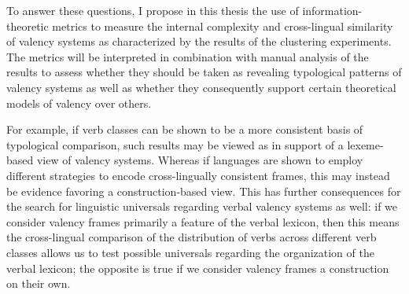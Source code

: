 To answer these questions, I propose in this thesis the use of information-theoretic metrics to measure the internal complexity and cross-lingual similarity of valency systems as characterized by the results of the clustering experiments. The metrics will be interpreted in combination with manual analysis of the results to assess whether they should be taken as revealing typological patterns of valency systems as well as whether they consequently support certain theoretical models of valency over others. 

For example, if verb classes can be shown to be a more consistent basis of typological comparison, such results may be viewed as in support of a lexeme-based view of valency systems. Whereas if languages are shown to employ different strategies to encode cross-lingually consistent frames, this may instead be evidence favoring a construction-based view. This has further consequences for the search for linguistic universals regarding verbal valency systems as well: if we consider valency frames primarily a feature of the verbal lexicon, then this means the cross-lingual comparison of the distribution of verbs across different verb classes allows us to test possible universals regarding the organization of the verbal lexicon; the opposite is true if we consider valency frames a construction on their own.